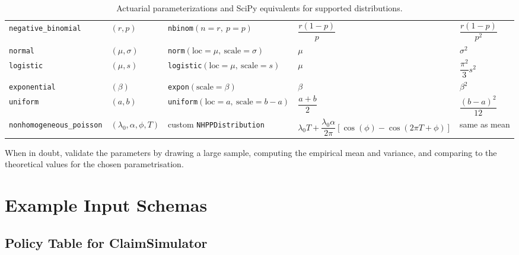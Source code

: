 \begin{table}[htbp]
\begin{tabularx}{\textwidth}{llllX}
  \texttt{negative\_binomial} 
  & $(r, p)$ 
  & \texttt{nbinom}$(n=r,\ p=p)$ 
  & $\dfrac{r(1-p)}{p}$ 
  & $\dfrac{r(1-p)}{p^2}$ \\
  
  \texttt{normal} 
  & $(\mu, \sigma)$ 
  & \texttt{norm}$(\text{loc}=\mu,\ \text{scale}=\sigma)$ 
  & $\mu$ 
  & $\sigma^2$ \\
  
  \texttt{logistic} 
  & $(\mu, s)$ 
  & \texttt{logistic}$(\text{loc}=\mu,\ \text{scale}=s)$ 
  & $\mu$ 
  & $\dfrac{\pi^2}{3}s^2$ \\
  
  \texttt{exponential} 
  & $(\beta)$ 
  & \texttt{expon}$(\text{scale}=\beta)$ 
  & $\beta$ 
  & $\beta^2$ \\
  
  \texttt{uniform} 
  & $(a, b)$ 
  & \texttt{uniform}$(\text{loc}=a,\ \text{scale}=b-a)$ 
  & $\dfrac{a+b}{2}$ 
  & $\dfrac{(b-a)^2}{12}$ \\
  
  \texttt{nonhomogeneous\_poisson} 
  & $(\lambda_0, \alpha, \phi, T)$ 
  & custom \texttt{NHPPDistribution} 
  & $\lambda_0 T + \dfrac{\lambda_0\alpha}{2\pi}
  \left[\cos(\phi)-\cos(2\pi T+\phi)\right]$ 
  & same as mean \\
  
  \bottomrule
  \end{tabularx}
  \caption{Actuarial parameterizations and SciPy equivalents for supported distributions.}
  \label{tab:actuarial_scipy_distributions}
  \end{table}

When in doubt, validate the parameters by drawing a large sample,
computing the empirical mean and variance, and comparing to the
theoretical values for the chosen parametrisation.

\section{Example Input Schemas}
\label{app:input_schemas}

\subsection*{Policy Table for ClaimSimulator}

